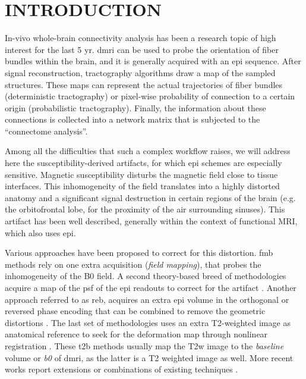 \section{INTRODUCTION}
\label{sec:intro}
In-vivo whole-brain connectivity analysis has been a research topic of high
  interest for the last 5 yr.
\Gls*{dmri} can be used to probe the orientation of fiber bundles within the
  brain, and it is generally acquired with an \gls*{epi} sequence.
After signal reconstruction, tractography algorithms draw a map of the sampled
  structures.
These maps can represent the actual trajectories of fiber bundles
  (deterministic tractography) or pixel-wise probability of connection
  to a certain origin (probabilistic tractography).
Finally, the information about these connections is collected into a network
  matrix that is subjected to the ``connectome analysis''.

Among all the difficulties that such a complex workflow raises, %
  we will address here the susceptibility-derived artifacts,
  for which \Gls*{epi} schemes are especially sensitive.
Magnetic susceptibility disturbs the magnetic field close to tissue interfaces.
This inhomogeneity of the field translates into a highly distorted anatomy
  and a significant signal destruction in certain regions of the brain 
  (e.g. the orbitofrontal lobe, for the proximity of the air surrounding sinuses).
This artifact has been well described, generally within the context of functional MRI,
  which also uses \gls*{epi}.

Various approaches have been proposed to correct for this distortion.
\Gls*{fmb} methods \cite{jezzard_correction_1995} rely on one extra
  acquisition (\emph{field mapping}), that probes the inhomogeneity of the
  B0 field.
A second theory-based breed of methodologies acquire a map of the \acrlong*{psf}
  of the \gls*{epi} readouts to correct for the artifact \cite{robson_measurement_1997}.
Another approach referred to as \gls*{reb}, acquires an extra \gls*{epi} volume in the
  orthogonal or reversed phase encoding that can be combined to remove the geometric
  distortions \cite{cordes_geometric_2000,chiou_simple_2000}.
The last set of methodologies uses an extra T2-weighted image as anatomical reference
  to seek for the deformation map through nonlinear registration 
  \cite{kybic_unwarping_2000,studholme_accurate_2000}.
These \gls*{t2b} methods usually map the T2w image to the \emph{baseline} volume or
  \textit{b0} of \gls*{dmri}, as the latter is a T2 weighted image as well.
More recent works report extensions or combinations of existing techniques 
  \cite{andersson_how_2003,zaitsev_point_2004,%
  holland_efficient_2010,andersson_comprehensive_2012}.

